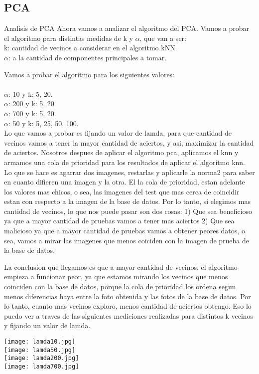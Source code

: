 \subsection{PCA}
Analisis de PCA
Ahora vamos a analizar el algoritmo del PCA.
Vamos a probar el algoritmo para distintas medidas de k y $\alpha$, que van a ser:\\
k: cantidad de vecinos a considerar en el algoritmo kNN.\\
$\alpha$: a la cantidad de componentes principales a tomar.

Vamos a probar el algoritmo para los siguientes valores:\\ \\
$\alpha$: 10  y k: 5, 20.\\
$\alpha$: 200 y k: 5, 20.\\
$\alpha$: 700 y k: 5, 20.\\
$\alpha$: 50  y k: 5, 25, 50, 100.\\


Lo que vamos a probar es fijando un valor de lamda, para que cantidad de vecinos vamos a tener la mayor cantidad de aciertos, y asi, maximizar la cantidad de aciertos.
Nosotros despues de aplicar el algoritmo pca, aplicamos el knn y armamos una cola de prioridad para los resultados de aplicar el algoritmo knn. Lo que se hace es agarrar dos imagenes, restarlas y aplicarle la norma2 para saber en cuanto difieren una imagen y la otra. El la cola de prioridad, estan adelante los valores mas chicos, o sea, las imagenes del test que mas cerca de coincidir estan con respecto a la imagen de la base de datos.
Por lo tanto, si elegimos mas cantidad de vecinos, lo que nos puede pasar son dos cosas:
1) Que sea beneficioso ya que a mayor cantidad de pruebas vamos a tener mas aciertos
2) Que sea malicioso ya que a mayor cantidad de pruebas vamos a obtener peores datos, o sea, vamos a mirar las imagenes que menos coiciden con la imagen de prueba de la base de datos.

La conclusion que llegamos es que a mayor cantidad de vecinos, el algoritmo empieza a funcionar peor, ya que estamos mirando los vecinos que menos coinciden con la base de datos, porque la cola de prioridad los ordena segun menos diferencias haya entre la foto obtenida y las fotos de la base de datos. 
Por lo tanto, cuanto mas vecinos exploro, menos cantidad de aciertos obtengo. Eso lo puedo ver a traves de las siguientes mediciones realizadas para distintos k vecinos y fijando un valor de lamda.

\texttt{[image: lamda10.jpg]}\\
\texttt{[image: lamda50.jpg]}\\
\texttt{[image: lamda200.jpg]}\\
\texttt{[image: lamda700.jpg]}\\


